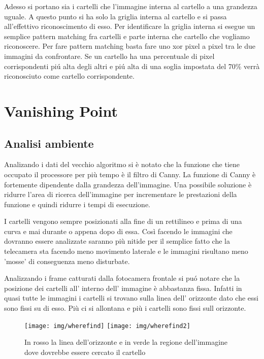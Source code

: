 		Adesso si portano sia i cartelli che l'immagine interna al cartello a una grandezza uguale. A questo punto si ha solo la griglia interna al cartello e si passa all'effettivo riconoscimento di esso. Per identificare la griglia interna si esegue un semplice pattern matching fra cartelli e parte interna che cartello che vogliamo riconoscere. Per fare pattern matching basta fare uno xor pixel a pixel tra le due immagini da confrontare. Se un cartello ha una percentuale di pixel corrispondenti pi\'u alta degli altri e pi\'u alta di una soglia impostata del 70\% verrà riconosciuto come cartello corrispondente.
		

\section{Vanishing Point}

	\subsection{Analisi ambiente}

		Analizando i dati del vecchio algoritmo si è notato che la funzione che tiene occupato il processore per più tempo è il filtro di Canny. La funzione di Canny è fortemente dipendente dalla grandezza dell'immagine. Una possibile soluzione è ridurre l'area di ricerca dell'immagine per incrementare le prestazioni della funzione e quindi ridurre i tempi di esecuzione.

		I cartelli vengono sempre posizionati alla fine di un rettilineo e prima di una curva e mai durante o appena dopo di essa. Così facendo le immagini che dovranno essere analizzate saranno più nitide per il semplice fatto che la telecamera sta facendo meno movimento laterale e le immagini risultano meno 'mosse' di conseguenza meno disturbate.

		Analizzando i frame catturati dalla fotocamera frontale si pu\'o notare che la posizione dei cartelli all' interno dell' immagine è abbastanza fissa. Infatti in quasi tutte le immagini i cartelli si trovano sulla linea dell' orizzonte dato che essi sono fissi su di esso. Più ci si allontana e più i cartelli sono fissi sull orizzonte.
		\begin{figure}[!ht]
			\centering
			\texttt{[image: img/wherefind]}
			\texttt{[image: img/wherefind2]}
			\caption[Area ricerca cartello]{In rosso la linea dell'orizzonte e in verde la regione dell'immagine dove dovrebbe essere cercato il cartello}
		\end{figure}


